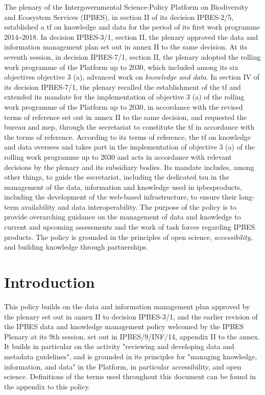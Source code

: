 \documentclass{article}
\begin{document}
The \gls{plenary} of the Intergovernmental Science-Policy Platform on Biodiversity and Ecosystem Services (IPBES), in section II of its decision IPBES-2/5, established a \gls{tf} on knowledge and data for the period of its first work programme 2014‒2018. In decision IPBES-3/1, section II, the \gls{plenary} approved the data and information management plan set out in annex II to the same decision. At its seventh session, in decision IPBES-7/1, section II, the \gls{plenary} adopted the rolling work programme of the Platform up to 2030, which included among its six objectives objective 3 (a), advanced work on \textit{knowledge and data}. In section IV of its decision IPBES-7/1, the \gls{plenary} recalled the establishment of the \gls{tf} and extended its mandate for the implementation of objective 3 (a) of the rolling work programme of the Platform up to 2030, in accordance with the revised terms of reference set out in annex II to the same decision, and requested the \gls{bureau} and \gls{mep}, through the \gls{secretariat} to constitute the \gls{tf} in accordance with the terms of reference. According to its terms of reference, the \gls{tf} on knowledge and data oversees and takes part in the implementation of objective 3 (a) of the rolling work programme up to 2030 and acts in accordance with relevant decisions by the \gls{plenary} and its subsidiary bodies. Its mandate includes, among other things, to guide the \gls{secretariat}, including the dedicated \gls{tsu} in the management of the \gls{data}, information and knowledge used in \glspl{ipbesproduct}, including the development of the web-based infrastructure, to ensure their long-term availability and data interoperability. The purpose of the policy is to provide overarching guidance on the management of data and knowledge to current and upcoming assessments and the work of task forces regarding IPBES products. The policy is grounded in the principles of open science, \textit{accessibility}, and building knowledge through partnerships.

\section{Introduction}

This policy builds on the data and information management plan approved by the \gls{plenary} set out in annex II to decision IPBES-3/1, and the earlier revision of the IPBES data and knowledge management policy welcomed by the IPBES Plenary at its 9th session, set out in IPBES/9/INF/14, appendix II to the annex. It builds in particular on the activity "reviewing and developing data and metadata guidelines", and is grounded in its principles for "managing knowledge, information, and data" in the Platform, in particular accessibility, and open science. Definitions of the terms used throughout this document can be found in the appendix to this policy.
\end{document}
